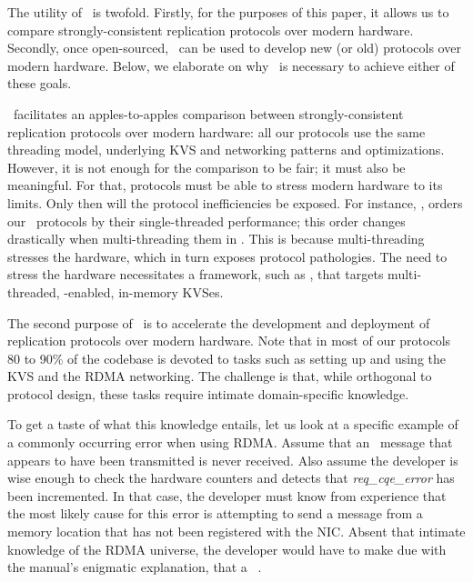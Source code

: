 The utility of \odlib~is twofold. Firstly, for the purposes of this paper, it allows us to compare strongly-consistent replication protocols over modern hardware.
Secondly, once open-sourced, \odlib\ can be used to develop new (or old) protocols over modern hardware.
Below, we elaborate on why \odlib\ is necessary to achieve either of these goals.


\odlib\ facilitates an apples-to-ap\-ples comparison between strongly-consistent replication protocols over modern hardware:
all our protocols use the same threading model, underlying KVS and networking patterns and optimizations.
However, it is not enough for the comparison to be fair; it must also be meaningful. For that, protocols must be able to stress modern hardware to its limits. Only then will the protocol inefficiencies be exposed.
For instance, , orders our \pnum\ protocols by their single-threaded performance;
this order changes drastically when multi-threading them in . 
This is because multi-threading stresses the hardware, which in turn exposes protocol pathologies. %
The need to stress the hardware necessitates a framework, such as \odlib, that targets multi-threaded, \RDMA-enabled, in-memory KVSes.


The second purpose of \odlib\ is to accelerate the development and deployment of replication protocols over modern hardware.
Note that in most of our protocols 80 to 90\% of the codebase is devoted to tasks such as %
setting up and using the KVS and the RDMA networking.
The challenge is that, while orthogonal to protocol design, these tasks 
require intimate domain-specific knowledge.

To get a taste of what this knowledge entails, let us look at a specific example of a commonly occurring error when using RDMA.
Assume that an \RDMA~message that appears to have been transmitted is never received.
Also assume 
the developer is wise enough to check the hardware counters and detects that \emph{req\_cqe\_error} has been incremented.
In that case, the developer must know from experience that the most likely cause for this error is attempting to send a message from a memory location that has not been registered with the NIC. Absent that intimate knowledge of the RDMA universe, the developer would have to make due
with the manual's enigmatic explanation, that a ~\cite{Mellanox:2020}.

